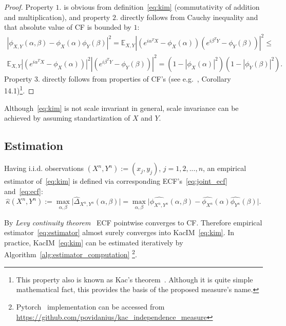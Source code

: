\documentclass{article}
\begin{document}
\begin{proof}
	Property $\textit{1.}$ is obvious from definition~\eqref{eq:kim} (commutativity of addition and multiplication), and property $\textit{2.}$ directly follows from Cauchy inequality and that absolute value of CF is bounded by $1$:
	\begin{multline*}
	|\phi_{X,Y}(\alpha, \beta)  -\phi_{X}(\alpha) \phi_{Y}(\beta)|^{2} =
	\mathbb{E}_{X,Y} |( e^{i\alpha^{T}X} - \phi_{X}(\alpha) )(e^{i\beta^{T}Y}- \phi_{Y}(\beta) )|^{2} \leq \\
	\mathbb{E}_{X,Y} |( e^{i\alpha^{T}X} - \phi_{X}(\alpha) )|^{2} |(e^{i\beta^{T}Y}- \phi_{Y}(\beta) )|^{2}  = (1 - |\phi_{X}(\alpha)|^{2}) (1 - |\phi_{Y}(\beta)|^{2}).
	\end{multline*}
	Property $\textit{3.}$ directly follows from properties of CF's (see e.g.~\cite{Jacod}, Corollary 14.1)\footnote{This property also is known as Kac's theorem~\cite{KacTheorem}. Although it is quite simple mathematical fact, this provides the basis of the proposed measure's name.}.	
\end{proof}

Although~\eqref{eq:kim} is not scale invariant in general, scale invariance can be achieved by assuming standartization of $X$ and $Y$.


\subsection{Estimation}

Having i.i.d. observations $(X^{n},Y^{n}) := (x_{j}, y_{j})$, $j = 1,2,...,n$, an empirical estimator of~\eqref{eq:kim} is defined via corresponding ECF's~\eqref{eq:joint_ecf} and~\eqref{eq:ecf}:
\begin{equation}
\label{eq:estimator}
\widehat{\kappa}(X^{n},Y^{n}) := \max_{\alpha, \beta} \vert \widehat{\Delta}_{X^{n},Y^{n}}(\alpha, \beta) \vert =\max_{\alpha, \beta} \vert \widehat{\phi_{X^{n},Y^{n}}}(\alpha,\beta)  - \widehat{\phi_{X^{n}}}(\alpha) \widehat{\phi_{Y^{n}}}(\beta) \vert.
\end{equation}

\noindent By \textit{Levy continuity theorem}~\cite{KacTheorem} ECF pointwise converges to CF. Therefore empirical estimator~\eqref{eq:estimator} almost surely converges into KacIM~\eqref{eq:kim}. In practice, KacIM~\eqref{eq:kim} can be estimated iteratively by Algorithm~\ref{alg:estimator_computation} \footnote{Pytorch~\cite{NEURIPS2019_9015} implementation can be accessed from \url{https://github.com/povidanius/kac_independence_measure}}. 
\end{document}
